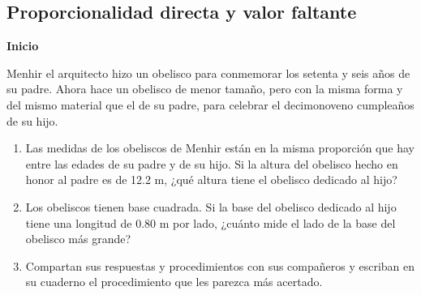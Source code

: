 \documentclass[11pt]{book}
\begin{document}
\subsection{Proporcionalidad directa y valor faltante}
\begin{boxK}
  \begin{center}\textbf{Inicio}\end{center}
  Menhir el arquitecto hizo un obelisco para conmemorar los setenta y seis años de su padre.
  Ahora hace un obelisco de menor tamaño, pero con la misma forma y del mismo material
  que el de su padre, para celebrar el decimonoveno cumpleaños de su hijo.
  \begin{enumerate}
    \item Las medidas de los obeliscos de Menhir están en la misma proporción que hay entre las
          edades de su padre y de su hijo. Si la altura del obelisco hecho en honor al padre es de
          12.2 m, ¿qué altura tiene el obelisco dedicado al hijo?

    \item Los obeliscos tienen base cuadrada. Si la base del obelisco dedicado al hijo tiene una
          longitud de 0.80 m por lado, ¿cuánto mide el lado de la base del obelisco más grande?
    \item Compartan sus respuestas y procedimientos con sus compañeros y escriban en su cuaderno
          el procedimiento que les parezca más acertado.
  \end{enumerate}
\end{boxK}
\end{document}
